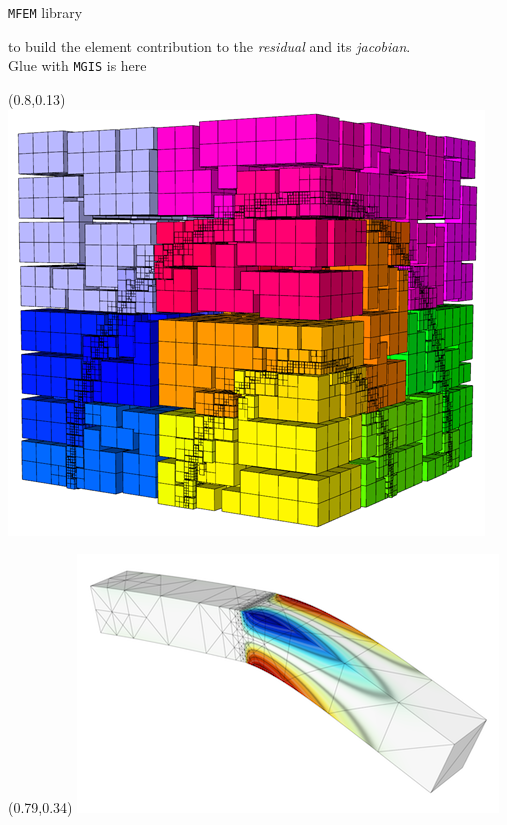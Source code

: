 \documentclass{beamer}
\begin{document}
\begin{frame}[fragile]{\texttt{MFEM} library}
\begin{itemize}
\begin{itemize}
    to build the element contribution to the \emph{residual} and its
    \emph{jacobian}.\\
    \hspace*{0.333em}\hspace*{0.333em}Glue with \texttt{MGIS} is here
  \end{itemize}
\end{itemize}
\begin{textblock}{.15}(0.8,0.13)
    \includegraphics[width=\textwidth]{img/amr1.png}
\end{textblock}
\begin{textblock}{.19}(0.79,0.34)
    \includegraphics[width=\textwidth]{img/ex21.png}
\end{textblock}

\end{frame}
\end{document}
